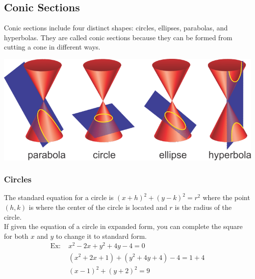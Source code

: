 \subsection{Conic Sections}
Conic sections include four distinct shapes: circles, ellipses, parabolas, and hyperbolas. They are called conic sections because they can be formed from cutting a cone in different ways.\\
\centerline{\includegraphics[scale=0.5]{PreCalcPictures/ConicSections.png}}

\subsubsection{Circles}
The standard equation for a circle is $(x+h)^2+(y-k)^2=r^2$ where the point $(h,k)$ is where the center of the circle is located and $r$ is the radius of the circle.\\
If given the equation of a circle in expanded form, you can complete the square for both $x$ and $y$ to change it to standard form.\\
\begin{align*}
    \text{Ex: } &x^2-2x+y^2+4y-4=0\\
    &(x^2+2x+1)+(y^2+4y+4)-4=1+4\\
    &(x-1)^2+(y+2)^2=9
\end{align*}

